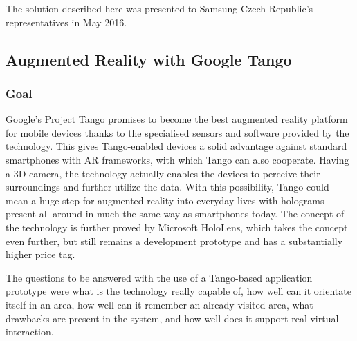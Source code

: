 \documentclass[12pt, a4paper]{article}
\begin{document}
The solution described here was presented to Samsung Czech Republic’s representatives in May 2016.

\subsection{Augmented Reality with Google Tango}
\subsubsection{Goal}
Google’s Project Tango promises to become the best augmented reality platform for mobile devices thanks to the specialised sensors and software provided by the technology. This gives Tango-enabled devices a solid advantage against standard smartphones with AR frameworks, with which Tango can also cooperate. Having a 3D camera, the technology actually enables the devices to perceive their surroundings and further utilize the data. With this possibility, Tango could mean a huge step for augmented reality into everyday lives with holograms present all around in much the same way as smartphones today. The concept of the technology is further proved by Microsoft HoloLens, which takes the concept even further, but still remains a development prototype and has a substantially higher price tag.

The questions to be answered with the use of a Tango-based application prototype were what is the technology really capable of, how well can it orientate itself in an area, how well can it remember an already visited area, what drawbacks are present in the system, and how well does it support real-virtual interaction.
\end{document}
